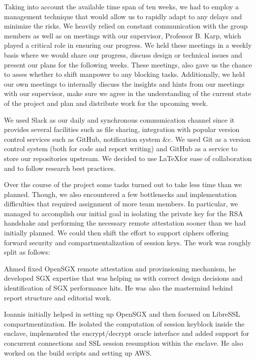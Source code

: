 \documentclass[../main.tex]{subfiles}
\begin{document}
Taking into account the available time span of ten weeks, we had to employ a
management technique that would allow us to rapidly adapt to any delays and
minimize the risks. We heavily relied on constant communication with the group
members as well as on meetings with our supervisor, Professor B. Karp, which
played a critical role in ensuring our progress. We held these meetings in a
weekly basis where we would share our progress, discuss design or technical
issues and present our plans for the following weeks. These meetings, also gave
us the chance to asses whether to shift manpower to any blocking tasks.
Additionally, we held our own meetings to internally discuss the insights and
hints from our meetings with our supervisor, make sure we agree in the
understanding of the current state of the project and plan and distribute work
for the upcoming week.

We used Slack as our daily and synchronous communication channel since it
provides several facilities such as file sharing, integration with popular
version control services such as GitHub, notification system \&c. We used
Git as a version control system (both for code and report writing) and GitHub
as a service to store our repositories upstream. We decided to use \LaTeX for
ease of collaboration and to follow research best practices.

Over the course of the project some tasks turned out to take less time than we
planned. Though, we also encountered a few bottlenecks and implementation
difficulties that required assignment of more team members. In particular, we
managed to accomplish our initial goal in isolating the private key for the RSA
handshake and performing the necessary remote attestation sooner than we had
initially planned. We could then shift the effort to support ciphers offering
forward security and compartmentalization of session keys. The work was roughly
split as follows:

Ahmed fixed OpenSGX remote attestation and provinsioning mechanism, he
developed SGX expertise that was helping us with correct design decisions and
identification of SGX performance hits. He was also the mastermind behind
report structure and editorial work.

Ioannis initially helped in setting up OpenSGX and then focused on LibreSSL
compartmentization. He isolated the computation of session keyblock inside the
enclave, implemented the encrypt/decrypt oracle interface and added support
for concurrent connections and SSL session resumption within the enclave. He
also worked on the build scripts and setting up AWS.
\end{document}
